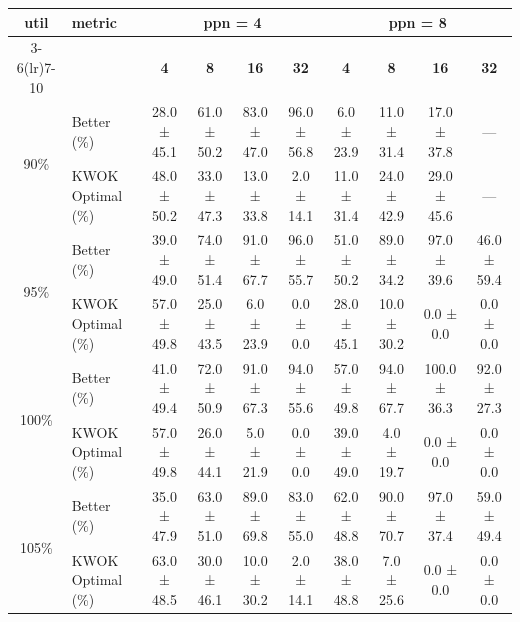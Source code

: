 \begin{tabular}{@{}c l *{8}{c}@{}}
\toprule
\multirow{2}{*}{\textbf{util}} & \multirow{2}{*}{\textbf{metric}} &\multicolumn{4}{c}{\textbf{ppn = 4}} & \multicolumn{4}{c}{\textbf{ppn = 8}}\\
\cmidrule(lr){3-6}\cmidrule(lr){7-10}
 &  & \textbf{4} & \textbf{8} & \textbf{16} & \textbf{32} & \textbf{4} & \textbf{8} & \textbf{16} & \textbf{32}\\
\midrule
\multirow{2}{*}{90\%}
& Better\,(\%) & 28.0 ± 45.1 & 61.0 ± 50.2 & 83.0 ± 47.0 & 96.0 ± 56.8 & 6.0 ± 23.9 & 11.0 ± 31.4 & 17.0 ± 37.8 & \multicolumn{1}{c}{—} \\
& KWOK\,Optimal\,(\%) & 48.0 ± 50.2 & 33.0 ± 47.3 & 13.0 ± 33.8 & 2.0 ± 14.1 & 11.0 ± 31.4 & 24.0 ± 42.9 & 29.0 ± 45.6 & \multicolumn{1}{c}{—} \\
\midrule
\multirow{2}{*}{95\%}
& Better\,(\%) & 39.0 ± 49.0 & 74.0 ± 51.4 & 91.0 ± 67.7 & 96.0 ± 55.7 & 51.0 ± 50.2 & 89.0 ± 34.2 & 97.0 ± 39.6 & 46.0 ± 59.4 \\
& KWOK\,Optimal\,(\%) & 57.0 ± 49.8 & 25.0 ± 43.5 & 6.0 ± 23.9 & 0.0 ± 0.0 & 28.0 ± 45.1 & 10.0 ± 30.2 & 0.0 ± 0.0 & 0.0 ± 0.0 \\
\midrule
\multirow{2}{*}{100\%}
& Better\,(\%) & 41.0 ± 49.4 & 72.0 ± 50.9 & 91.0 ± 67.3 & 94.0 ± 55.6 & 57.0 ± 49.8 & 94.0 ± 67.7 & 100.0 ± 36.3 & 92.0 ± 27.3 \\
& KWOK\,Optimal\,(\%) & 57.0 ± 49.8 & 26.0 ± 44.1 & 5.0 ± 21.9 & 0.0 ± 0.0 & 39.0 ± 49.0 & 4.0 ± 19.7 & 0.0 ± 0.0 & 0.0 ± 0.0 \\
\midrule
\multirow{2}{*}{105\%}
& Better\,(\%) & 35.0 ± 47.9 & 63.0 ± 51.0 & 89.0 ± 69.8 & 83.0 ± 55.0 & 62.0 ± 48.8 & 90.0 ± 70.7 & 97.0 ± 37.4 & 59.0 ± 49.4 \\
& KWOK\,Optimal\,(\%) & 63.0 ± 48.5 & 30.0 ± 46.1 & 10.0 ± 30.2 & 2.0 ± 14.1 & 38.0 ± 48.8 & 7.0 ± 25.6 & 0.0 ± 0.0 & 0.0 ± 0.0 \\
\bottomrule
\end{tabular}
